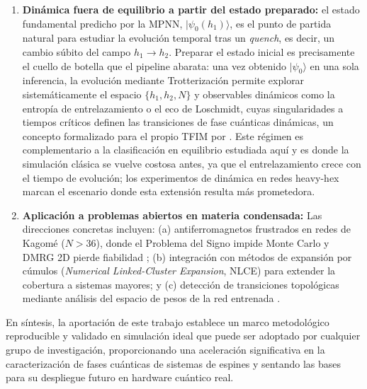 \documentclass[11pt,a4paper,spanish]{book}
\begin{document}
\begin{enumerate}
    \item \textbf{Dinámica fuera de equilibrio a partir del estado preparado:} el estado fundamental predicho por la MPNN, $|\psi_0(h_1)\rangle$, es el punto de partida natural para estudiar la evolución temporal tras un \emph{quench}, es decir, un cambio súbito del campo $h_1 \to h_2$. Preparar el estado inicial es precisamente el cuello de botella que el pipeline abarata: una vez obtenido $|\psi_0\rangle$ en una sola inferencia, la evolución mediante Trotterización permite explorar sistemáticamente el espacio $\{h_1, h_2, N\}$ y observables dinámicos como la entropía de entrelazamiento o el eco de Loschmidt, cuyas singularidades a tiempos críticos definen las transiciones de fase cuánticas dinámicas, un concepto formalizado para el propio TFIM por \citet{heyl2013}. Este régimen es complementario a la clasificación en equilibrio estudiada aquí y es donde la simulación clásica se vuelve costosa antes, ya que el entrelazamiento crece con el tiempo de evolución; los experimentos de dinámica en redes heavy-hex \citep{kim2023} marcan el escenario donde esta extensión resulta más prometedora.

    \item \textbf{Aplicación a problemas abiertos en materia condensada:} Las direcciones concretas incluyen: (a) antiferromagnetos frustrados en redes de Kagomé ($N > 36$), donde el Problema del Signo impide Monte Carlo y DMRG 2D pierde fiabilidad \citep{troyer2005, ahsan2025}; (b) integración con métodos de expansión por cúmulos (\emph{Numerical Linked-Cluster Expansion}, NLCE) \citep{rigol2006} para extender la cobertura a sistemas mayores; y (c) detección de transiciones topológicas mediante análisis del espacio de pesos de la red entrenada \citep{hernandes2025}.
\end{enumerate}

En síntesis, la aportación de este trabajo establece un marco metodológico reproducible y validado en simulación ideal que puede ser adoptado por cualquier grupo de investigación, proporcionando una aceleración significativa en la caracterización de fases cuánticas de sistemas de espines y sentando las bases para su despliegue futuro en hardware cuántico real.


\end{document}
